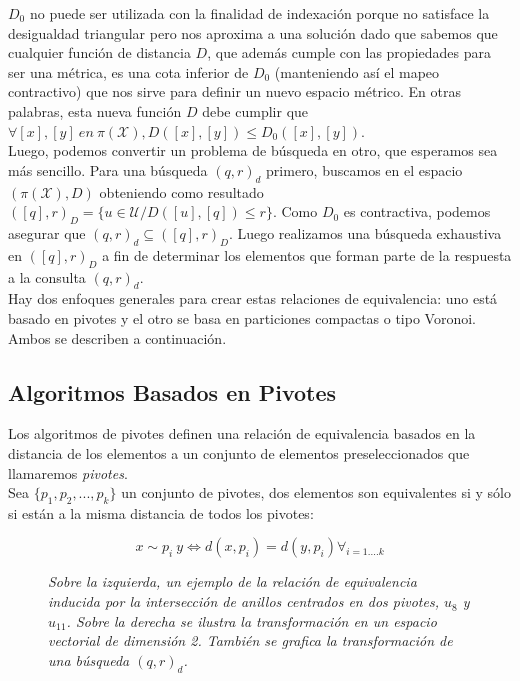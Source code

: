 $D_0$ no puede ser utilizada con la finalidad de indexaci\'on porque no satisface la desigualdad triangular pero nos aproxima a una soluci\'on dado que sabemos que cualquier funci\'on de distancia $D$, que adem\'as cumple con las propiedades para ser una m\'etrica, es una cota inferior de $D_0$ (manteniendo as\'i el mapeo contractivo) que nos sirve para definir un nuevo espacio m\'etrico. En otras palabras, esta nueva funci\'on $D$ debe cumplir que $\forall [x],[y]\:en\:\pi(\mathcal{X}),  D([x],[y]) \leq D_0([x],[y])$.\\

Luego, podemos convertir un problema de b\'usqueda en otro, que esperamos sea m\'as sencillo. Para una b\'usqueda $(q, r)_d$ primero, buscamos en el espacio $(\pi(\mathcal{X}), D)$ obteniendo como resultado $([q], r)_D = \{u \in  \mathcal{U}/ D([u],[q]) \leq r\}$. Como $D_0$  es contractiva, podemos asegurar que $(q, r)_d \subseteq ([q], r)_D$.  Luego realizamos una b\'usqueda exhaustiva en $([q], r)_D$ a fin de determinar los elementos que forman parte de la respuesta a la consulta $(q, r)_d$.\\
				
Hay dos enfoques generales para crear estas relaciones de equivalencia: uno est\'a basado en pivotes y el otro se basa en particiones compactas o tipo Voronoi. Ambos se describen a continuaci\'on.

\subsection{Algoritmos Basados en Pivotes}

Los algoritmos de pivotes definen una relaci\'on de equivalencia basados en la distancia de los elementos a un conjunto de elementos preseleccionados que llamaremos \textit{pivotes}.\\

Sea $\{p_1, p_2,...,p_k\}$ un conjunto de pivotes, dos elementos son equivalentes si y s\'olo si est\'an a la misma distancia de todos los pivotes:

\[
x \sim p_i \: y \Leftrightarrow d(x,p_i) = d(y,p_i) \forall_{i = 1....k}
\]

\begin{figure}[htb]
\centerline{ %
   \vspace{.2in}
   }
   \caption [Relaci\'on de equivalencia inducida por dos pivotes y su
   correspondiente transformaci\'on en un espacio vectorial]
     {\textsl{\footnotesize{Sobre la izquierda, un ejemplo de la relaci\'on de equivalencia inducida
        por la intersecci\'on de anillos centrados en dos pivotes, $u_8$ y $u_{11}$.
        Sobre la derecha se ilustra la transformaci\'on en un espacio vectorial de dimensi\'on 2.
    	Tambi\'en se grafica la transformaci\'on de una b\'usqueda $(q,r)_d$. }}}
\label{piv1}
\end{figure} 

